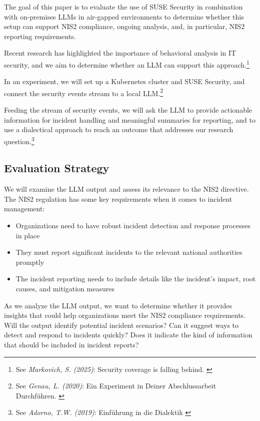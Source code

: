 The goal of this paper is to evaluate the use of SUSE Security in combination with on-premises LLMs in air-gapped environments to determine whether this setup can support NIS2 compliance, ongoing analysis, and, in particular, NIS2 reporting requirements.

Recent research has highlighted the importance of behavioral analysis in IT security, and we aim to determine whether an LLM can support this approach.\footnote{See \textit{Markovich, S. (2025)}: Security coverage is falling behind. \cite{expScribbr}}

In an experiment, we will set up a Kubernetes cluster and SUSE Security, and connect the security events stream to a local LLM.\footnote{See \textit{Genau, L. (2020)}: Ein Experiment in Deiner Abschlussarbeit Durchführen. \cite{expScribbr}}

Feeding the stream of security events, we will ask the LLM to provide actionable information for incident handling and meaningful summaries for reporting, and to use a dialectical approach to reach an outcome that addresses our research question.\footnote{See \textit{Adorno, T.W. (2019)}: Einführung in die Dialektik \cite{introDialectic}}

\subsection{Evaluation Strategy}

We will examine the LLM output and assess its relevance to the NIS2 directive. The NIS2 regulation has some key requirements when it comes to incident management:

\begin{itemize}
    \item Organizations need to have robust incident detection and response processes in place
    \item They must report significant incidents to the relevant national authorities promptly
    \item The incident reporting needs to include details like the incident's impact, root causes, and mitigation measures
\end{itemize}

As we analyze the LLM output, we want to determine whether it provides insights that could help organizations meet the NIS2 compliance requirements. Will the output identify potential incident scenarios? Can it suggest ways to detect and respond to incidents quickly? Does it indicate the kind of information that should be included in incident reports?

